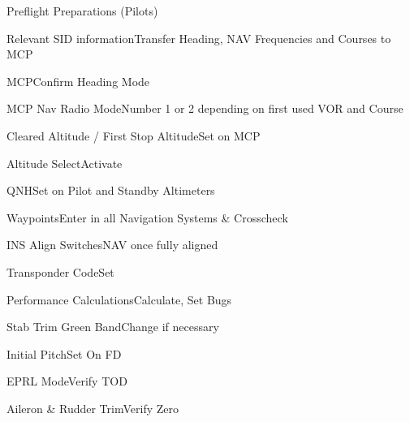 \documentclass[sim-use]{checklist}
\begin{document}
\begin{checklist}{Preflight Preparations (Pilots)}
	\item{Relevant SID information}{Transfer Heading, NAV Frequencies and Courses to MCP}
	\item{MCP}{Confirm Heading Mode}
	\item{MCP Nav Radio Mode}{Number 1 or 2 depending on first used VOR and Course}
\end{checklist}

\begin{continuedchecklist}
	\item{Cleared Altitude / First Stop Altitude}{Set on MCP}
	\item{Altitude Select}{Activate}
	\item{QNH}{Set on Pilot and Standby Altimeters}
	\item{Waypoints}{Enter in all Navigation Systems \& Crosscheck}
	\item{INS Align Switches}{NAV once fully aligned}
	\item{Transponder Code}{Set}
	\item{Performance Calculations}{Calculate, Set Bugs}
	\item{Stab Trim Green Band}{Change if necessary}
	\item{Initial Pitch}{Set On FD}
	\item{EPRL Mode}{Verify TOD}
	\item{Aileron \& Rudder Trim}{Verify Zero}
\end{continuedchecklist}
\end{document}
